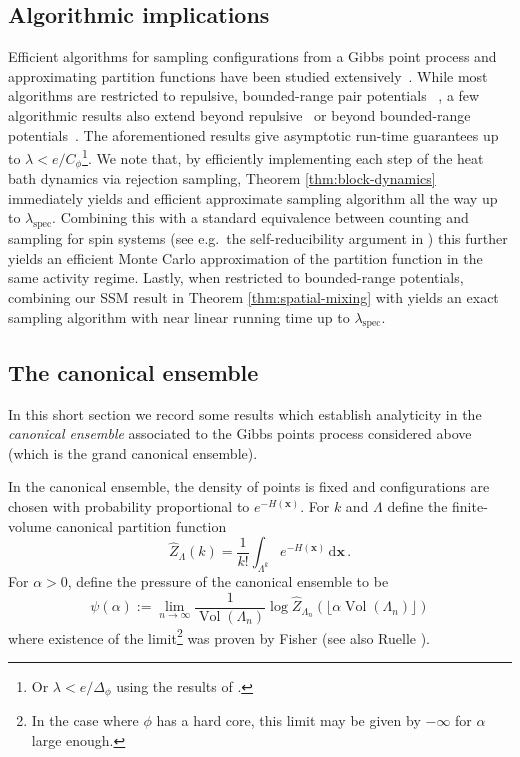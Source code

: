 \documentclass[10pt]{amsart}
\theoremstyle{definition}
\theoremstyle{remark}
\newcommand{\spec}{{\mathrm{spec}}}
\newcommand{\Vol}{\operatorname{Vol}}
\newcommand{\diff}{\mathrm{d}}
\begin{document}
	\subsection{Algorithmic implications}
	Efficient algorithms for sampling configurations from a Gibbs point process and approximating partition functions have been studied extensively~\cite{friedrich2022spectral,michelen2022strong,jerrum2019perfect,anand2023perfect,FGKKP2025,jenssen2024quasipolynomial}.
	While most algorithms are restricted to repulsive, bounded-range pair potentials
	~\cite{friedrich2022spectral,michelen2022strong,jerrum2019perfect,anand2023perfect}, a few algorithmic results also extend beyond repulsive~\cite{jenssen2024quasipolynomial} or beyond bounded-range potentials~\cite{FGKKP2025}. 
	The aforementioned results give asymptotic run-time guarantees up to $\lambda<e/C_\phi$\footnote{Or $\lambda<e/\Delta_\phi$ using the results of \cite{michelen2025potential}.}.
	We note that, by efficiently implementing each step of the heat bath dynamics via rejection sampling, Theorem \ref{thm:block-dynamics} immediately yields and efficient approximate sampling algorithm all the way up to $\lambda_\spec$.
	Combining this with a standard equivalence between counting and sampling for spin systems (see e.g.\ the self-reducibility argument in \cite{michelen2022strong}) this further yields an efficient Monte Carlo approximation of the partition function in the same activity regime.
	Lastly, when restricted to bounded-range potentials, combining our SSM result in Theorem \ref{thm:spatial-mixing} with \cite{anand2023perfect} yields an exact sampling algorithm with near linear running time up to $\lambda_\spec$.
	
	
	\subsection{The canonical ensemble}
	In this short section we record some results which establish analyticity in the \emph{canonical ensemble} associated to the Gibbs points process considered above (which is the grand canonical ensemble). 
	
	In the canonical ensemble, the density of points is fixed and configurations are chosen with probability proportional to $e^{-H(\mathbf{x})}$. For $k$ and $\Lambda$ define the finite-volume canonical partition function $$\widehat{Z}_{\Lambda}(k) = \frac{1}{k!} \int_{\Lambda^{k}} e^{-H(\mathbf{x})}\,\diff \mathbf{x}\,.$$
	For $\alpha > 0$, define the pressure of the canonical ensemble to be  
	$$\psi(\alpha) := \lim_{n \to \infty} \frac{1}{\Vol(\Lambda_n)}\log \widehat{Z}_{\Lambda_n}(\lfloor \alpha \Vol(\Lambda_n)\rfloor ) 
	$$
	where existence of the limit\footnote{In the case where $\phi$ has a hard core, this limit may be given by $-\infty$ for $\alpha$ large enough.} was proven by Fisher \cite{fisher1964free} (see also Ruelle \cite{ruelle1969statistical}).   
	
\end{document}
